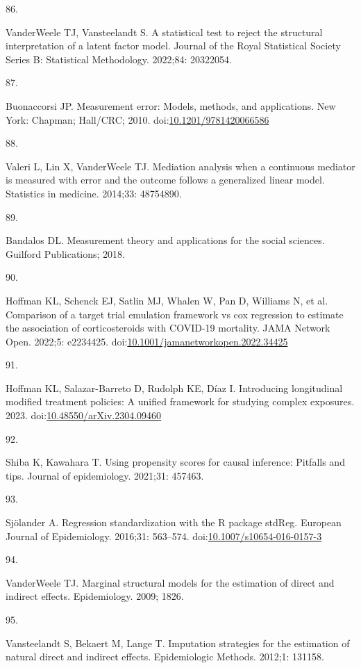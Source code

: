 \documentclass[
  singlecolumn]{article}
\newlength{\cslhangindent}
\newlength{\csllabelwidth}
\newlength{\cslentryspacingunit} %
\newenvironment{CSLReferences}[2] %
 {%
  \setlength{\parindent}{0pt}
  \ifodd #1
  \let\oldpar\par
  \def\par{\hangindent=\cslhangindent\oldpar}
  \fi
  \setlength{\parskip}{#2\cslentryspacingunit}
 }%
 {}
\newcommand{\CSLLeftMargin}[1]{\parbox[t]{\csllabelwidth}{#1}}
\newcommand{\CSLRightInline}[1]{\parbox[t]{\linewidth - \csllabelwidth}{#1}\break}
\begin{document}
\begin{CSLReferences}{0}{0}
\leavevmode{}%
\CSLLeftMargin{86. }%
\CSLRightInline{VanderWeele TJ, Vansteelandt S. A statistical test to
reject the structural interpretation of a latent factor model. Journal
of the Royal Statistical Society Series B: Statistical Methodology.
2022;84: 20322054. }

\leavevmode{}%
\CSLLeftMargin{87. }%
\CSLRightInline{Buonaccorsi JP. Measurement error: Models, methods, and
applications. New York: Chapman; Hall/CRC; 2010.
doi:\href{https://doi.org/10.1201/9781420066586}{10.1201/9781420066586}}

\leavevmode{}%
\CSLLeftMargin{88. }%
\CSLRightInline{Valeri L, Lin X, VanderWeele TJ. Mediation analysis when
a continuous mediator is measured with error and the outcome follows a
generalized linear model. Statistics in medicine. 2014;33: 48754890. }

\leavevmode{}%
\CSLLeftMargin{89. }%
\CSLRightInline{Bandalos DL. Measurement theory and applications for the
social sciences. Guilford Publications; 2018. }

\leavevmode{}%
\CSLLeftMargin{90. }%
\CSLRightInline{Hoffman KL, Schenck EJ, Satlin MJ, Whalen W, Pan D,
Williams N, et al. Comparison of a target trial emulation framework vs
cox regression to estimate the association of corticosteroids with
COVID-19 mortality. JAMA Network Open. 2022;5: e2234425.
doi:\href{https://doi.org/10.1001/jamanetworkopen.2022.34425}{10.1001/jamanetworkopen.2022.34425}}

\leavevmode{}%
\CSLLeftMargin{91. }%
\CSLRightInline{Hoffman KL, Salazar-Barreto D, Rudolph KE, Díaz I.
Introducing longitudinal modified treatment policies: A unified
framework for studying complex exposures. 2023.
doi:\href{https://doi.org/10.48550/arXiv.2304.09460}{10.48550/arXiv.2304.09460}}

\leavevmode{}%
\CSLLeftMargin{92. }%
\CSLRightInline{Shiba K, Kawahara T. Using propensity scores for causal
inference: Pitfalls and tips. Journal of epidemiology. 2021;31: 457463.
}

\leavevmode{}%
\CSLLeftMargin{93. }%
\CSLRightInline{Sjölander A. Regression standardization with the R
package stdReg. European Journal of Epidemiology. 2016;31: 563--574.
doi:\href{https://doi.org/10.1007/s10654-016-0157-3}{10.1007/s10654-016-0157-3}}

\leavevmode{}%
\CSLLeftMargin{94. }%
\CSLRightInline{VanderWeele TJ. Marginal structural models for the
estimation of direct and indirect effects. Epidemiology. 2009; 1826. }

\leavevmode{}%
\CSLLeftMargin{95. }%
\CSLRightInline{Vansteelandt S, Bekaert M, Lange T. Imputation
strategies for the estimation of natural direct and indirect effects.
Epidemiologic Methods. 2012;1: 131158. }

\end{CSLReferences}
\end{document}
